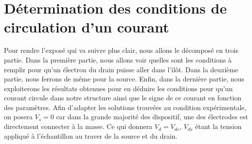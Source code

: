 \section{Détermination des conditions de circulation d'un courant}
Pour rendre l'exposé qui va suivre plus clair, nous allons le décomposé en trois partie. Dans la première partie, nous allons voir quelles sont les conditions à remplir pour qu'un électron du drain puisse aller dans l'il\^ot. Dans la deuxième partie, nous ferrons de m\^eme pour la source. Enfin, dans la dernière partie, nous exploiterons les résultats obtenues pour en déduire les conditions pour qu'un courant circule dans notre structure ainsi que le signe de ce courant en fonction des paramètres. Afin d'adapter les solutions trouvées au condition expérimentale, on posera $V_s = 0$ car dans la grande majorité des dispositif, une des électrodes est directement connecter à la masse. Ce qui donnera $V_d=V_{ds}$, $V_{ds}$ étant la tension appliqué à l'échantillon au traver de la source et du drain.

